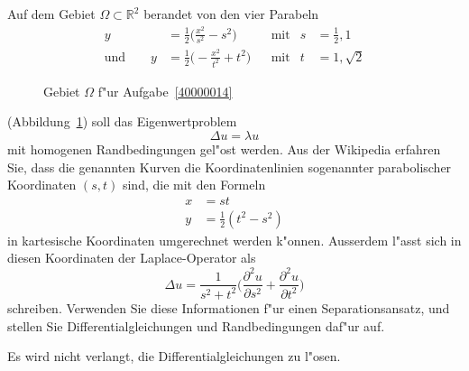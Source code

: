 Auf dem Gebiet $\Omega\subset\mathbb R^2$ berandet von den vier Parabeln
\[
\begin{aligned}
y&=\frac12\biggl( \frac{x^2}{s^2}-s^2\biggr)&&\text{mit}&s&=\frac12,1\\
\text{und}\qquad
y&=\frac12\biggl(-\frac{x^2}{t^2}+t^2\biggr)&&\text{mit}&t&=1,\sqrt{2}
\end{aligned}
\]
\begin{figure}
\centering
{}
\caption{Gebiet $\Omega$ f"ur Aufgabe~\ref{40000014}
\label{40000014:domain}}
\end{figure}
(Abbildung~\ref{40000014:domain})
soll das Eigenwertproblem
\begin{equation}
\Delta u = \lambda u
\label{40000014:dgl}
\end{equation}
mit homogenen Randbedingungen gel"ost werden.
Aus der Wikipedia erfahren Sie, dass die genannten Kurven 
die Koordinatenlinien sogenannter parabolischer Koordinaten $(s,t)$ sind,
die mit den Formeln
\begin{align*}
x&=st\\
y&=\frac12(t^2-s^2)
\end{align*}
in kartesische Koordinaten umgerechnet werden k"onnen.
Ausserdem l"asst sich in diesen Koordinaten der Laplace-Operator als
\[
\Delta u = \frac1{s^2 + t^2}\biggl(\frac{\partial^2 u}{\partial s^2}+\frac{\partial^2u}{\partial t^2}\biggr)
\]
schreiben.
Verwenden Sie diese Informationen f"ur einen Separationsansatz, und
stellen Sie Differentialgleichungen und Randbedingungen daf"ur auf.

\begin{hinweis}
Es wird nicht verlangt, die Differentialgleichungen zu l"osen.
\end{hinweis}

